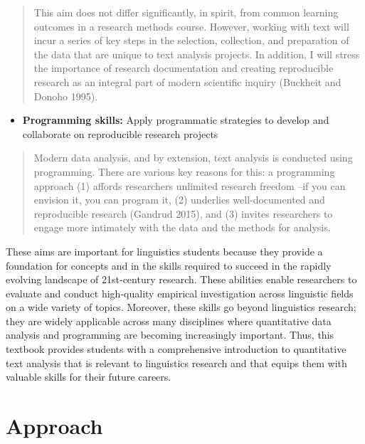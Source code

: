 \documentclass[
  letterpaper,
]{latex/krantz}
\providecommand{\tightlist}{%
  \setlength{\itemsep}{0pt}\setlength{\parskip}{0pt}}\usepackage{longtable,booktabs,array}
\begin{document}
\begin{quote}
This aim does not differ significantly, in spirit, from common learning
outcomes in a research methods course. However, working with text will
incur a series of key steps in the selection, collection, and
preparation of the data that are unique to text analysis projects. In
addition, I will stress the importance of research documentation and
creating reproducible research as an integral part of modern scientific
inquiry (Buckheit and Donoho 1995).
\end{quote}

\begin{itemize}
\tightlist
\item
  \textbf{Programming skills:} Apply programmatic strategies to develop
  and collaborate on reproducible research projects
\end{itemize}

\begin{quote}
Modern data analysis, and by extension, text analysis is conducted using
programming. There are various key reasons for this: a programming
approach (1) affords researchers unlimited research freedom --if you can
envision it, you can program it, (2) underlies well-documented and
reproducible research (Gandrud 2015), and (3) invites researchers to
engage more intimately with the data and the methods for analysis.
\end{quote}

These aims are important for linguistics students because they provide a
foundation for concepts and in the skills required to succeed in the
rapidly evolving landscape of 21st-century research. These abilities
enable researchers to evaluate and conduct high-quality empirical
investigation across linguistic fields on a wide variety of topics.
Moreover, these skills go beyond linguistics research; they are widely
applicable across many disciplines where quantitative data analysis and
programming are becoming increasingly important. Thus, this textbook
provides students with a comprehensive introduction to quantitative text
analysis that is relevant to linguistics research and that equips them
with valuable skills for their future careers.

\hypertarget{approach}{%
\section*{Approach}\label{approach}}

\end{document}
